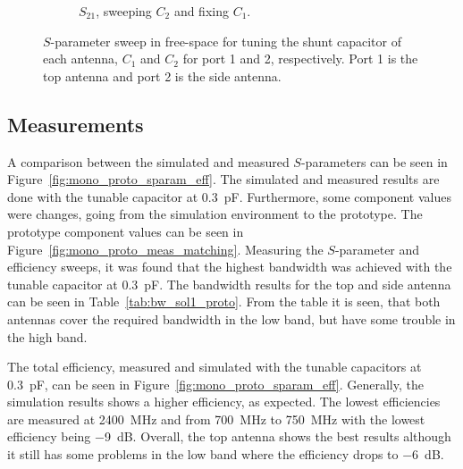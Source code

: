 \begin{figure}[htbp]
\begin{subfigure}[b]{0.49\linewidth}
        \caption{$S_{21}$, sweeping $C_2$ and fixing $C_1$.}
        \label{fig:ant1_proto_sim_s22_s12}
    \end{subfigure}
    \caption{$S$-parameter sweep in free-space for tuning the shunt capacitor of each antenna, $C_1$ and $C_2$ for port 1 and 2, respectively. Port 1 is the top antenna and port 2 is the side antenna.}
    \label{fig:sparam_mono_proto_sim}
\end{figure}

\FloatBarrier
\subsection{Measurements} %
A comparison between the simulated and measured $S$-parameters can be seen in Figure~\ref{fig:mono_proto_sparam_eff}. The simulated and measured results are done with the tunable capacitor at \SI{0.3}{pF}. Furthermore, some component values were changes, going from the simulation environment to the prototype. The prototype component values can be seen in Figure~\ref{fig:mono_proto_meas_matching}. Measuring the $S$-parameter and efficiency sweeps, it was found that the highest bandwidth was achieved with the tunable capacitor at \SI{0.3}{pF}. The bandwidth results for the top and side antenna can be seen in Table~\ref{tab:bw_sol1_proto}. From the table it is seen, that both antennas cover the required bandwidth in the low band, but have some trouble in the high band. 

The total efficiency, measured and simulated with the tunable capacitors at \SI{0.3}{pF}, can be seen in Figure~\ref{fig:mono_proto_sparam_eff}. Generally, the simulation results shows a higher efficiency, as expected. The lowest efficiencies are measured at \SI{2400}{MHz} and from \SI{700}{MHz} to \SI{750}{MHz} with the lowest efficiency being \SI{-9}{dB}. Overall, the top antenna shows the best results although it still has some problems in the low band where the efficiency drops to \SI{-6}{dB}.

